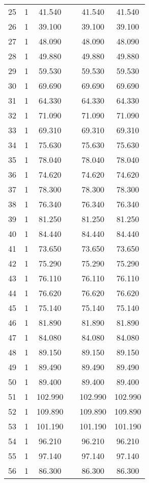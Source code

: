 \begin{table}[!htbp]
\begin{tabular}{@{\extracolsep{5pt}}lccccc}
25 & 1 & 41.540 &  & 41.540 & 41.540 \\ 
26 & 1 & 39.100 &  & 39.100 & 39.100 \\ 
27 & 1 & 48.090 &  & 48.090 & 48.090 \\ 
28 & 1 & 49.880 &  & 49.880 & 49.880 \\ 
29 & 1 & 59.530 &  & 59.530 & 59.530 \\ 
30 & 1 & 69.690 &  & 69.690 & 69.690 \\ 
31 & 1 & 64.330 &  & 64.330 & 64.330 \\ 
32 & 1 & 71.090 &  & 71.090 & 71.090 \\ 
33 & 1 & 69.310 &  & 69.310 & 69.310 \\ 
34 & 1 & 75.630 &  & 75.630 & 75.630 \\ 
35 & 1 & 78.040 &  & 78.040 & 78.040 \\ 
36 & 1 & 74.620 &  & 74.620 & 74.620 \\ 
37 & 1 & 78.300 &  & 78.300 & 78.300 \\ 
38 & 1 & 76.340 &  & 76.340 & 76.340 \\ 
39 & 1 & 81.250 &  & 81.250 & 81.250 \\ 
40 & 1 & 84.440 &  & 84.440 & 84.440 \\ 
41 & 1 & 73.650 &  & 73.650 & 73.650 \\ 
42 & 1 & 75.290 &  & 75.290 & 75.290 \\ 
43 & 1 & 76.110 &  & 76.110 & 76.110 \\ 
44 & 1 & 76.620 &  & 76.620 & 76.620 \\ 
45 & 1 & 75.140 &  & 75.140 & 75.140 \\ 
46 & 1 & 81.890 &  & 81.890 & 81.890 \\ 
47 & 1 & 84.080 &  & 84.080 & 84.080 \\ 
48 & 1 & 89.150 &  & 89.150 & 89.150 \\ 
49 & 1 & 89.490 &  & 89.490 & 89.490 \\ 
50 & 1 & 89.400 &  & 89.400 & 89.400 \\ 
51 & 1 & 102.990 &  & 102.990 & 102.990 \\ 
52 & 1 & 109.890 &  & 109.890 & 109.890 \\ 
53 & 1 & 101.190 &  & 101.190 & 101.190 \\ 
54 & 1 & 96.210 &  & 96.210 & 96.210 \\ 
55 & 1 & 97.140 &  & 97.140 & 97.140 \\ 
56 & 1 & 86.300 &  & 86.300 & 86.300 \\ 

\end{tabular}
\end{table}
